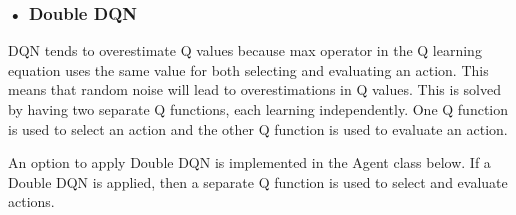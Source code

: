 \documentclass[11pt]{article}
\begin{document}
\hypertarget{double-dqn}{%
\subsubsection{• Double DQN}\label{double-dqn}}

DQN tends to overestimate Q values because max operator in the Q
learning equation uses the same value for both selecting and evaluating
an action. This means that random noise will lead to overestimations in
Q values. This is solved by having two separate Q functions, each
learning independently. One Q function is used to select an action and
the other Q function is used to evaluate an action.

An option to apply Double DQN is implemented in the Agent class below.
If a Double DQN is applied, then a separate Q function is used to select
and evaluate actions.
\end{document}
